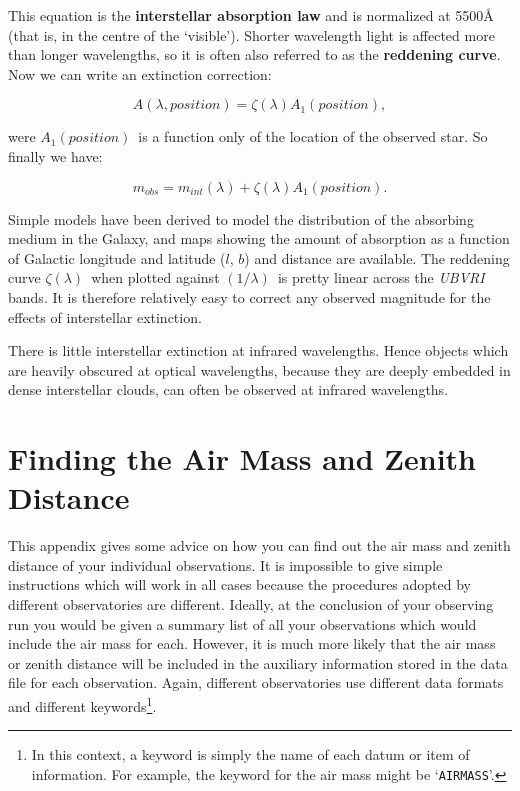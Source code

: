 \documentclass[twoside,11pt]{article}
\newcommand{\xlabel}[1]{}
\begin{document}
This equation is the {\bf interstellar absorption law} and is normalized at
5500\AA~ (that is, in the centre of the `visible').  Shorter wavelength
light is affected more than longer wavelengths, so it is often also
referred to as the {\bf reddening curve}. Now we can write an extinction
correction:

\begin{equation}
A(\lambda,position) = \zeta (\lambda) A_1(position)  ,
\end{equation}

were $A_1(position)$\, is a function only of the location of the
observed star.  So finally we have:

\begin{equation}
m_{obs} = m_{int}(\lambda) + \zeta (\lambda)A_1(position).
\end{equation}

Simple models\cite{JASCHEK87} have been derived to model the
distribution of the absorbing medium in the Galaxy, and
maps\cite{NECKEL66, NECKEL80} showing the amount of absorption as a
function of Galactic longitude and latitude ($l$, $b$) and distance
are available.  The reddening curve $\zeta(\lambda)$\, when plotted
against $(1/\lambda)$\, is pretty linear across the {\it UBVRI}\,
bands\cite{SCHILD77}. It is therefore relatively easy to correct any
observed magnitude for the effects of interstellar extinction.

There is little interstellar extinction at infrared wavelengths.  Hence
objects which are heavily obscured at optical wavelengths, because they
are deeply embedded in dense interstellar clouds, can often be observed
at infrared wavelengths.


\newpage
\section{\xlabel{FINDAIRM}\label{FINDAIRM}Finding the Air Mass and
Zenith Distance}

This appendix gives some advice on how you can find out the air mass
and zenith distance of your individual observations.  It is impossible
to give simple instructions which will work in all cases because the
procedures adopted by different observatories are different.  Ideally,
at the conclusion of your observing run you would be given a summary
list of all your observations which would include the air mass for
each.  However, it is much more likely that the air mass or zenith
distance will be included in the auxiliary information stored in the
data file for each observation.  Again, different observatories use
different data formats and different keywords\footnote{In this context,
a keyword is simply the name of each datum or item of information.  For
example, the keyword for the air mass might be `{\tt AIRMASS}'.}.
\end{document}
